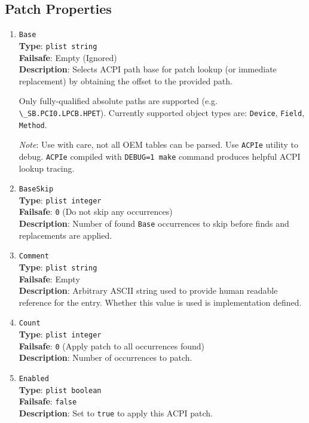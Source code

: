 \documentclass[]{article}
\begin{document}
\subsection{Patch Properties}\label{acpipropspatch}

\begin{enumerate}

\item
  \texttt{Base}\\
  \textbf{Type}: \texttt{plist\ string}\\
  \textbf{Failsafe}: Empty (Ignored)\\
  \textbf{Description}: Selects ACPI path base for patch lookup (or immediate
  replacement) by obtaining the offset to the provided path.

  Only fully-qualified absolute paths are supported (e.g. \texttt{\textbackslash \_SB.PCI0.LPCB.HPET}).
  Currently supported object types are: \texttt{Device}, \texttt{Field}, \texttt{Method}.

  \emph{Note}: Use with care, not all OEM tables can be parsed. Use \texttt{ACPIe}
  utility to debug. \texttt{ACPIe} compiled  with \texttt{DEBUG=1 make} command
  produces helpful ACPI lookup tracing.

\item
  \texttt{BaseSkip}\\
  \textbf{Type}: \texttt{plist\ integer}\\
  \textbf{Failsafe}: \texttt{0} (Do not skip any occurrences)\\
  \textbf{Description}: Number of found \texttt{Base} occurrences to skip before
  finds and replacements are applied.

\item
  \texttt{Comment}\\
  \textbf{Type}: \texttt{plist\ string}\\
  \textbf{Failsafe}: Empty\\
  \textbf{Description}: Arbitrary ASCII string used to provide human readable
  reference for the entry. Whether this value is used is implementation defined.

\item
  \texttt{Count}\\
  \textbf{Type}: \texttt{plist\ integer}\\
  \textbf{Failsafe}: \texttt{0} (Apply patch to all occurrences found)\\
  \textbf{Description}: Number of occurrences to patch.

\item
  \texttt{Enabled}\\
  \textbf{Type}: \texttt{plist\ boolean}\\
  \textbf{Failsafe}: \texttt{false}\\
  \textbf{Description}: Set to \texttt{true} to apply this ACPI patch.


\end{enumerate}
\end{document}
